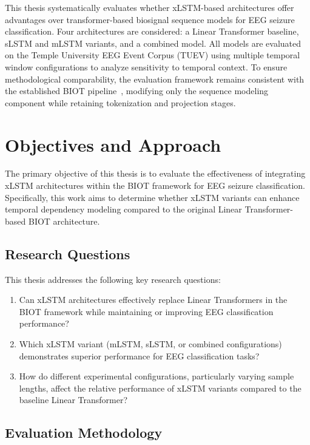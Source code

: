This thesis systematically evaluates whether \ac{xLSTM}-based architectures offer advantages over transformer-based biosignal sequence models for \ac{EEG} seizure classification. Four architectures are considered: a Linear Transformer baseline, \acf{sLSTM} and \acf{mLSTM} variants, and a combined model. All models are evaluated on the Temple University \ac{EEG} Event Corpus (\ac{TUEV}) using multiple temporal window configurations to analyze sensitivity to temporal context. To ensure methodological comparability, the evaluation framework remains consistent with the established \ac{BIOT} pipeline~\cite{yang2023biot}, modifying only the sequence modeling component while retaining tokenization and projection stages.


\section{Objectives and Approach}
\label{sec:introduction:objectives}

The primary objective of this thesis is to evaluate the effectiveness of integrating \ac{xLSTM} architectures within the \ac{BIOT} framework for \ac{EEG} seizure classification. Specifically, this work aims to determine whether \ac{xLSTM} variants can enhance temporal dependency modeling compared to the original Linear Transformer-based \ac{BIOT} architecture.

\subsection{Research Questions}

This thesis addresses the following key research questions:

\begin{enumerate}
    \item Can \ac{xLSTM} architectures effectively replace Linear Transformers in the \ac{BIOT} framework while maintaining or improving EEG classification performance?
    \item Which \ac{xLSTM} variant (\ac{mLSTM}, \ac{sLSTM}, or combined configurations) demonstrates superior performance for \ac{EEG} classification tasks?
    \item How do different experimental configurations, particularly varying sample lengths, affect the relative performance of \ac{xLSTM} variants compared to the baseline Linear Transformer?
\end{enumerate}

\subsection{Evaluation Methodology}

